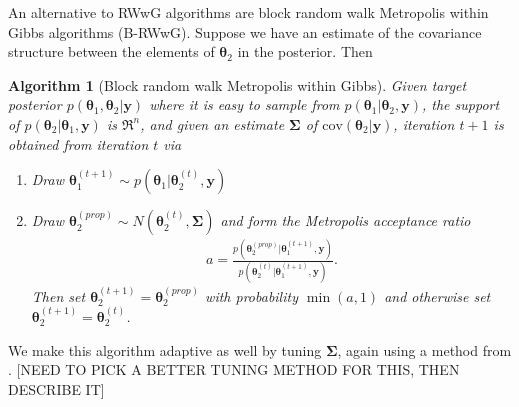 \documentclass[12pt]{article}
\newtheorem{alg}{Algorithm}
\begin{document}
An alternative to RWwG algorithms are block random walk Metropolis within Gibbs algorithms (B-RWwG). Suppose we have an estimate of the covariance structure between the elements of $\bm{\theta}_2$ in the posterior. Then 
\begin{alg}[Block random walk Metropolis within Gibbs]\label{alg:B-RWwG}
Given target posterior $p(\bm{\theta}_1,\bm{\theta}_2|\bm{y})$ where it is easy to sample from $p(\bm{\theta}_1|\bm{\theta}_2,\bm{y})$, the support of $p(\bm{\theta}_{2}|\bm{\theta}_1,\bm{y})$ is $\Re^n$, and given an estimate $\bm{\Sigma}$ of $\mathrm{cov}(\bm{\theta}_2|\bm{y})$, iteration $t+1$ is obtained from iteration $t$ via
\begin{enumerate}
\item Draw $\bm{\theta}_1^{(t+1)} \sim p(\bm{\theta}_1|\bm{\theta}_2^{(t)},\bm{y})$
\item Draw $\bm{\theta}_{2}^{(prop)} \sim N(\bm{\theta}_{2}^{(t)}, \bm{\Sigma})$ and form the Metropolis acceptance ratio
\begin{align*}
a = \frac{p(\bm{\theta}_{2}^{(prop)}|\bm{\theta}_1^{(t+1)},\bm{y})}{p(\bm{\theta}_{2}^{(t)}|\bm{\theta}_1^{(t+1)},\bm{y})}.
\end{align*}
Then set $\bm{\theta}_{2}^{(t+1)}=\bm{\theta}_{2}^{(prop)}$ with probability $\min(a,1)$ and otherwise set $\bm{\theta}_{2}^{(t+1)} = \bm{\theta}_{2}^{(t)}$.
\end{enumerate}
\end{alg}
We make this algorithm adaptive as well by tuning $\bm{\Sigma}$, again using a method from \citet{andrieu2008tutorial}. [NEED TO PICK A BETTER TUNING METHOD FOR THIS, THEN DESCRIBE IT]
 
\clearpage\pagebreak\newpage\thispagestyle{empty}


\end{document}
